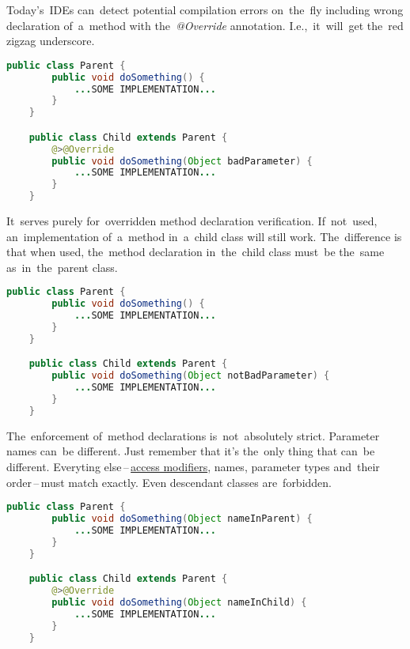 \note Today's~IDEs can~detect potential compilation errors on~the~fly including wrong declaration of~a~method with the~\textit{@Override} annotation.
I.e.,~it~will~get the~red zigzag underscore.

\begin{lstlisting}[language=Java]
    public class Parent {
        public void doSomething() {
            ...SOME IMPLEMENTATION...
        }
    }

    public class Child extends Parent {
        @>@Override
        public void doSomething(Object badParameter) {
            ...SOME IMPLEMENTATION...
        }
    }
\end{lstlisting}

\warning It~serves purely for~overridden method declaration verification.
If~not~used, an~implementation of~a~method in~a~child class will still work.
The~difference is that when used, the~method declaration in~the~child class must~be the~same as~in~the~parent class.

\begin{lstlisting}[language=Java]
    public class Parent {
        public void doSomething() {
            ...SOME IMPLEMENTATION...
        }
    }

    public class Child extends Parent {
        public void doSomething(Object notBadParameter) {
            ...SOME IMPLEMENTATION...
        }
    }
\end{lstlisting}

\warning The~enforcement of~method declarations is~not~absolutely strict.
Parameter names can~be different.
Just remember that it's the~only thing that can~be different.
Everyting else\,--\,\hyperref[javaaccessmodifiers]{access modifiers}, names, parameter types and~their order\,--\,must match exactly.
Even descendant classes are~forbidden.

\begin{lstlisting}[language=Java]
    public class Parent {
        public void doSomething(Object nameInParent) {
            ...SOME IMPLEMENTATION...
        }
    }

    public class Child extends Parent {
        @>@Override
        public void doSomething(Object nameInChild) {
            ...SOME IMPLEMENTATION...
        }
    }
\end{lstlisting}

